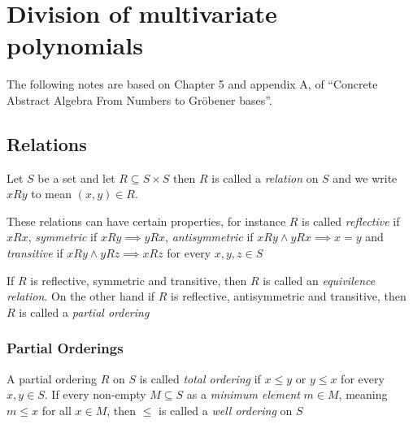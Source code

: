\chapter{Division of multivariate polynomials}
The following notes are based on Chapter 5 and appendix A, of ``Concrete Abstract Algebra From Numbers to Gröbener bases''.
\section{Relations}
\begin{definition}
Let $S$ be a set and let $R \subseteq S \times S$ then $R$ is called a \textit{relation} on $S$ and we write $x R y$ to mean $(x,y) \in R$.
\end{definition}

\begin{definition}
These relations can have certain properties, for instance $R$ is called \textit{reflective} if $x R x$, \textit{symmetric} if $x R y \implies y R x$, \textit{antisymmetric} if $x R y \wedge y R x \implies x = y$ and \textit{transitive} if $x R y \wedge y R z \implies x R z$ for every $x, y, z \in S$
\end{definition}

\begin{definition}
If $R$ is reflective, symmetric and transitive, then $R$ is called an \textit{equivilence relation}.
On the other hand if $R$ is reflective, antisymmetric and transitive, then $R$ is called a \textit{partial ordering}
\end{definition}

\subsection{Partial Orderings}
\begin{definition}
A partial ordering $R$ on $S$ is called \textit{total ordering} if $x \leq y$ or $y \leq x$ for every $x,y \in S$.
If every non-empty $M \subseteq S$ as a \textit{minimum element} $m \in M$, meaning $m \leq x$ for all $x \in M$, then $\leq$ is called a \textit{well ordering} on $S$
\end{definition}

